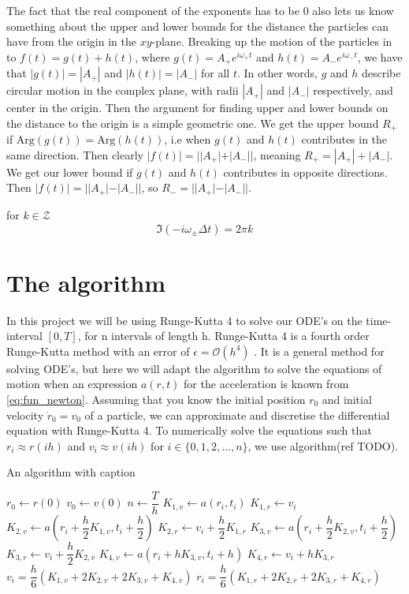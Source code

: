 The fact that the real component of the exponents has to be $0$ also lets us know something about the upper and lower bounds for the distance the particles can have from the origin in the $xy$-plane. Breaking up the motion of the particles in to $f(t) = g(t) + h(t)$, where $g(t) = A_+e^{i\omega_+ t}$ and $h(t) = A_-e^{i\omega_- t}$, we have that $|g(t)| = |A_+|$ and $|h(t)| = |A_-|$ for all $t$. In other words, $g$ and $h$ describe circular motion in the complex plane, with radii $|A_+|$ and $|A_-|$ respectively, and center in the origin. Then the argument for finding upper and lower bounds on the distance to the origin is a simple geometric one. We get the upper bound $R_+$ if $\text{Arg}(g(t)) = \text{Arg}(h(t))$, i.e when $g(t)$ and $h(t)$ contributes in the same direction. Then clearly $|f(t)| = ||A_+| + |A_-||$, meaning $R_+ = |A_+| + |A_-|$. We get our lower bound if $g(t)$ and $h(t)$ contributes in opposite directions. Then $|f(t)| = ||A_+| - |A_-||$, so $R_- = ||A_+| - |A_-||$. %


for $k \in \mathcal{Z}$
$$\Im(-i \omega_\pm \Delta t) = 2 \pi k$$

\section*{The algorithm}
In this project we will be using Runge-Kutta 4 to solve our ODE's on the time-interval $[0, T]$, for n intervals of length h. Runge-Kutta 4 is a fourth order Runge-Kutta method with an error of $\epsilon = \mathcal{O}(h^4)$ . It is a general method for solving ODE's, but here we will adapt the algorithm to solve the equations of motion when an expression $a(r, t)$ for the acceleration is known from \ref{eq:fun_newton}. Assuming that you know the initial position $r_0$ and initial velocity $\dot{r}_0=v_0$ of a particle, we can approximate and discretise the differential equation with Runge-Kutta 4. To numerically solve the equations such that $r_i \approx r(ih)$ and $v_i \approx v(ih)$ for $i \in \{0, 1, 2, \ldots, n\}$, we use algorithm(ref TODO).

\begin{algorithm}
\caption{An algorithm with caption}\label{alg:cap} %
\begin{algorithmic}[1]
\State $r_0 \gets r(0)$
	\State $v_0 \gets v(0)$
	\State $n \gets \dfrac{T}{h}$
        \State $K_{1,v} \gets a(r_i, t_i)$
		\State $K_{1,r} \gets v_i$
		\State $K_{2,v} \gets a(r_i + \dfrac{h}{2}K_{1,v}, t_i + \dfrac{h}{2})$
		\State $K_{2,r} \gets v_i + \dfrac{h}{2} K_{1,r}$
		\State $K_{3,v} \gets a(r_i + \dfrac{h}{2}K_{2,v}, t_i + \dfrac{h}{2})$
		\State $K_{3,r} \gets v_i + \dfrac{h}{2} K_{2,v}$
		\State $K_{4, v} \gets a(r_i + hK_{3,v}, t_i+h)$
		\State $K_{4, r} \gets v_i + hK_{3,r}$
		\State $v_i = \dfrac{h}{6}(K_{1,v} + 2K_{2,v} + 2K_{3,v} + K_{4,v})$
		\State $r_i = \dfrac{h}{6}(K_{1,r} + 2K_{2,r} + 2K_{3,r} + K_{4,r})$
	\EndFor
\end{algorithmic}
\end{algorithm}

